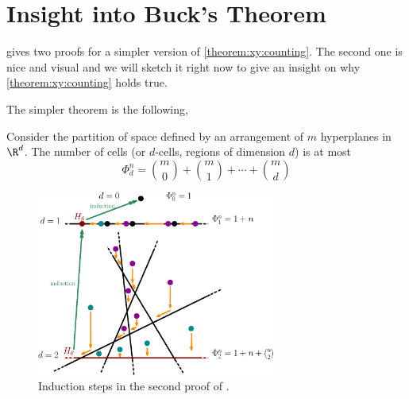 \section{Insight into Buck's Theorem}

\citet*{matousek:2002} gives two proofs for a simpler version of
\ref{theorem:xy:counting}. The second one is nice and visual and we will
sketch it right now to give an insight on why \ref{theorem:xy:counting} holds
true.

The simpler theorem is the following,

\begin{theorem}
Consider the partition of space defined by an arrangement of \(m\) hyperplanes
in \(\R^d\). The number of cells (or \(d\)-cells, regions of dimension \(d\))
is at most
\begin{displaymath}
\Phi_d^n = \binom{m}{0} + \binom{m}{1} + \cdots + \binom{m}{d}
\end{displaymath}
\end{theorem}

\begin{figure}
\centering
\includegraphics[width=0.7\textwidth]{fig/x+y/buck/arrangement}
\caption{Induction steps in the second proof of \citet*{matousek:2002}.}
\label{fig:xy:buck:arrangement}
\end{figure}

